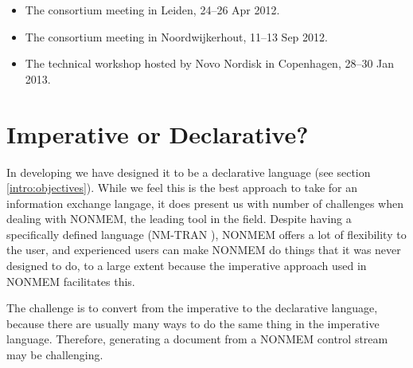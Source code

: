 \begin{itemize}
\item The \ddmore consortium meeting in Leiden, 24--26 Apr 2012.
\item The \ddmore consortium meeting in Noordwijkerhout, 11--13 Sep 2012.
\item The \ddmore technical workshop hosted by Novo Nordisk in Copenhagen, 28--30 Jan 2013.
\end{itemize}

\section{Imperative or Declarative?}

In developing \pharmml we have designed it to be a declarative language (see section \ref{intro:objectives}).
While we feel this is the best approach to take for an information exchange langage, it does present us
with number of challenges when dealing with NONMEM, the leading tool in the field. Despite
having a specifically defined language (NM-TRAN \cite{NONMEM:2009}), NONMEM offers a lot of flexibility
to the user, and experienced users can make NONMEM do things that it was never designed to do, to a large
extent because the imperative approach used in NONMEM facilitates this.

The challenge is to convert from the imperative to the declarative language, because there are usually many
ways to do the same thing in the imperative language. Therefore, generating a \pharmml document from a NONMEM
control stream may be challenging.



